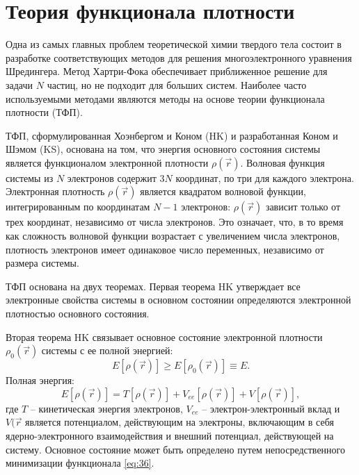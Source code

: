 \chapter{Теория функционала плотности}
Одна из самых главных проблем теоретической химии твердого тела состоит в разработке соответствующих методов для решения многоэлектронного уравнения Шредингера. Метод Хартри-Фока обеспечивает приближенное решение для задачи \(N\) частиц, но не подходит для больших систем. Наиболее часто используемыми методами являются методы на основе теории функционала плотности (ТФП).

ТФП, сформулированная Хоэнбергом и Коном (HK) и разработанная Коном и Шэмом (KS), основана на том, что энергия основного состояния системы является функционалом электронной плотности \(\rho(\vec{r})\). Волновая функция системы из \(N\) электронов содержит \(3N\) координат, по три для каждого электрона. Электронная плотность \(\rho(\vec{r})\) является квадратом волновой функции, интегрированным по координатам \(N-1\) электронов: \(\rho(\vec{r})\) зависит только от трех координат, независимо от числа электронов. Это означает, что, в то время как сложность волновой функции возрастает с увеличением числа электронов, плотность электронов имеет одинаковое число переменных, независимо от размера системы.

ТФП основана на двух теоремах. Первая теорема HK утверждает все электронные свойства системы в основном состоянии определяются электронной плотностью основного состояния.

Вторая теорема HK связывает основное состояние электронной плотности \(\rho_0(\vec{r})\) системы с ее полной энергией:
\begin{equation*}
    E[\rho(\vec{r})] \ge E[\rho_0(\vec{r})] \equiv E.
\end{equation*}
Полная энергия:
\begin{equation}
    E[\rho(\vec{r})] = T[\rho(\vec{r})] + V_{ee}[\rho(\vec{r})]
                     + V[\rho(\vec{r})],
    \label{eq:36}
\end{equation}
где \(T\) -- кинетическая энергия электронов, \(V_{ee}\) -- электрон-электронный вклад и \(V(\vec{r}\) является потенциалом, действующим на электроны, включающим в себя ядерно-электронного взаимодействия и внешний потенциал, действующей на систему. Основное состояние может быть определено путем непосредственного минимизации функционала \eqref{eq:36}.

